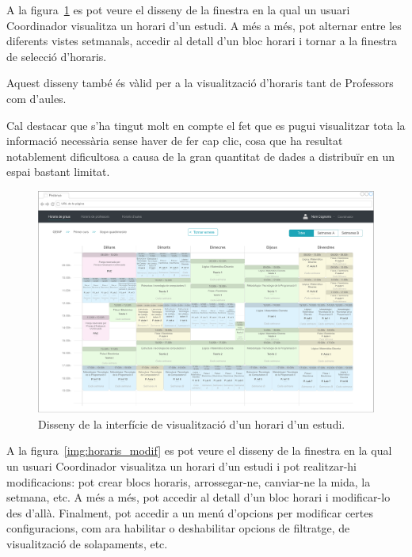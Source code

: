 \documentclass[a4paper,12pt]{ThesisStyle}
\begin{document}
\newpage

A la figura~\ref{img:horaris_visualitzacio} es pot veure el disseny de la finestra en la qual un usuari Coordinador visualitza un horari d'un estudi. A més a més, pot alternar entre les diferents vistes setmanals, accedir al detall d'un bloc horari i tornar a la finestra de selecció d'horaris.

Aquest disseny també és vàlid per a la visualització d'horaris tant de Professors com d'aules.

Cal destacar que s'ha tingut molt en compte el fet que es pugui visualitzar tota la informació necessària sense haver de fer cap clic, cosa que ha resultat notablement dificultosa a causa de la gran quantitat de dades a distribuïr en un espai bastant limitat.

\begin{figure}[H]
	\centering
	\includegraphics[width=\textwidth]{assets/interfaces/horaris/visualitzacio.pdf}
	\caption{\label{img:horaris_visualitzacio}Disseny de la interfície de visualització d'un horari d'un estudi.}
\end{figure}

\newpage

A la figura~\ref{img:horaris_modif} es pot veure el disseny de la finestra en la qual un usuari Coordinador visualitza un horari d'un estudi i pot realitzar-hi modificacions: pot crear blocs horaris, arrossegar-ne, canviar-ne la mida, la setmana, etc. A més a més, pot accedir al detall d'un bloc horari i modificar-lo des d'allà. Finalment, pot accedir a un menú d'opcions per modificar certes configuracions, com ara habilitar o deshabilitar opcions de filtratge, de visualització de solapaments, etc.
\end{document}
